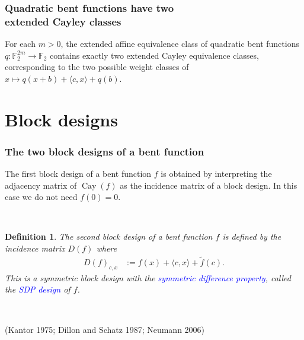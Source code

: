 \documentclass[pdf,sprung,slideColor,nocolorBG]{beamer}
\newenvironment{colortheme}[1]{
\def\ProvidesPackageRCS $##1${\relax}
\renewcommand{\ProcessOptions}{\relax}
\makeatletter

\makeatother
}{}
\newcommand{\slidecite}[1]{\tiny{(#1)}\normalsize{}}
\newcommand{\mb}[1]{\mathbb{#1}}
\newcommand{\Emph}[1]{\emph{\textcolor{blue}{#1}}}
\newcommand{\To}{\rightarrow}
\newcommand{\Cay}[1]{\operatorname{Cay}\left(#1\right)}
\newcommand{\dual}[1]{\widetilde{#1}}
\newcommand{\F}{\mb{F}}
\newtheorem{Def}{Definition}
\begin{document}
\begin{colortheme}{jubata}
\begin{frame}
\frametitle{Quadratic bent functions have two \\ extended Cayley classes}
\begin{Theorem}
For each $m>0$, the extended affine equivalence class of quadratic bent functions
$q : \F_2^{2m} \To \F_2$ contains exactly two extended Cayley equivalence classes,
corresponding to the two possible weight classes of $x \mapsto q(x+b) + \langle c, x \rangle + q(b)$.
\end{Theorem}

\end{frame}

\end{colortheme}

\section{Block designs}

\begin{colortheme}{seagull}

\begin{frame}
\frametitle{The two block designs of a bent function}

The first block design of a bent function $f$ is obtained by interpreting
the adjacency matrix of $\Cay{f}$ as the incidence matrix of a block design.
In this case we do not need $f(0)=0$.

~
\begin{Def}
The second block design of a bent function $f$ is defined by the incidence matrix
$D(f)$ where
\begin{align*}
D(f)_{c,x} &:= f(x) + \langle c, x \rangle + \dual{f}(c).
\end{align*}
This is a symmetric block design with the \Emph{symmetric difference property},
called the \Emph{SDP design} of $f$.
\end{Def}

~

\slidecite{Kantor 1975; Dillon and Schatz 1987; Neumann 2006}
\end{frame}

\end{colortheme}
\end{document}
